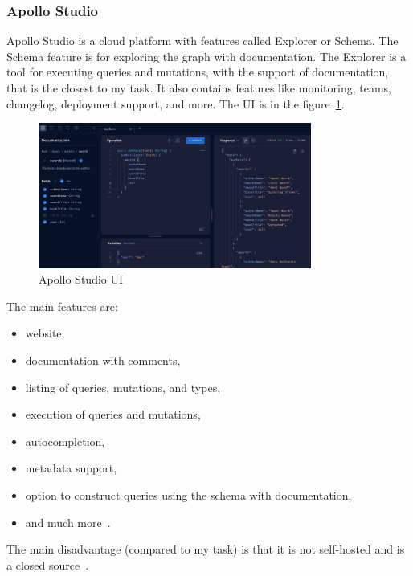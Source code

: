 \subsubsection{Apollo Studio}
Apollo Studio is a cloud platform with features called Explorer or Schema.
The Schema feature is for exploring the graph with documentation.
The Explorer is a tool for executing queries and mutations, with the support of documentation, that is the closest to my task.
It also contains features like monitoring, teams, changelog, deployment support, and more.
The UI is in the figure~\ref{fig:graphql-apollo-studio}.
\cite{graphql-apollo-studio}

\begin{figure}[hbt!]
    \centering
    \captionsetup{justification=centering}
    \includegraphics[width=0.8\textwidth]{images/graphql/apollo-studio}
    \caption{Apollo Studio UI~\cite{graphql-apollo-studio}}
    \label{fig:graphql-apollo-studio}
\end{figure}

The main features are:
\begin{itemize}
    \item website,
    \item documentation with comments,
    \item listing of queries, mutations, and types,
    \item execution of queries and mutations,
    \item autocompletion,
    \item metadata support,
    \item option to construct queries using the schema with documentation,
    \item and much more~\cite{graphql-apollo-studio}.
\end{itemize}

The main disadvantage (compared to my task) is that it is not self-hosted and is a closed source~\cite{graphql-apollo-studio}.

